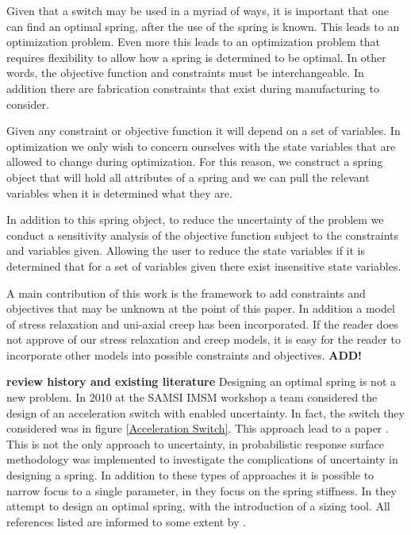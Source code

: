 \documentclass[10pt]{article}
\begin{document}
Given that a switch may be used in a myriad of ways, it is important that one can find an optimal spring, after the use of the spring is known. This leads to an optimization problem. Even more this leads to an optimization problem that requires flexibility to allow how a spring is determined to be optimal. In other words, the objective function and constraints must be interchangeable. In addition there are fabrication constraints that exist during manufacturing to consider.  

Given any constraint or objective function it will depend on a set of variables. In optimization we only wish to concern ourselves with the state variables that are allowed to change during optimization. For this reason, we construct a spring object that will hold all attributes of a spring and we can pull the relevant variables when it is determined what they are. 

In addition to this spring object, to reduce the uncertainty of the problem we conduct a sensitivity analysis of the objective function subject to the constraints and variables given. Allowing the user to reduce the state variables if it is determined that for a set of variables given there exist insensitive state variables. 

A main contribution of this work is the framework to add constraints and objectives that may be unknown at the point of this paper. In addition a model of stress relaxation and uni-axial creep has been incorporated. If the reader does not approve of our stress relaxation and creep models, it is easy for the reader to incorporate other models into possible constraints and objectives. 
\textbf{ADD!}


\textbf{review history and existing literature}
Designing an optimal spring is not a new problem. In 2010 at the SAMSI IMSM workshop a team considered the design of an acceleration switch with enabled uncertainty. In fact, the switch they considered was in figure \ref{Acceleration Switch}. This approach lead to a paper \cite{IMSM2010}. This is not the only approach to uncertainty, in \cite{Reliability} probabilistic response surface methodology was implemented to investigate the complications of uncertainty in designing a spring. In addition to these types of approaches it is possible to narrow focus to a single parameter, in \cite{Robust} they focus on the spring stiffness. In \cite{Paredes} they attempt to design an optimal spring, with the introduction of a sizing tool. All references listed are informed to some extent by \cite{Wahl}. 
\end{document}
